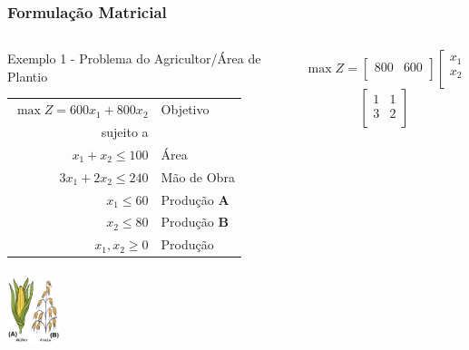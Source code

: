 \documentclass{beamer}
\begin{document}
\begin{frame}
	\frametitle{Formulação Matricial} 
	\begin{columns}
		\begin{column}{0.5\textwidth}
			\centering
			\begin{exampleblock}{Exemplo 1 - Problema do Agricultor/Área de Plantio}
				\scriptsize
				\begin{table}
					\begin{tabular}{r | l}
						{\color{red} $ \max Z = 600x_1+800x_2$ } & {\color{red} Objetivo } \\
						sujeito a & \\
						{\color{blue}$x_1+x_2 \le 100$} &  {\color{blue} Área} \\
						{\color{olive}$3x_1+2x_2 \le 240$} & {\color{olive}Mão de Obra} \\
						{$x_1 \le 60 $ } & {Produção \textbf{A} } \\
						{$x_2 \le 80 $ } &  {Produção  \textbf{B} } \\
						{$x_1, x_2 \ge 0$ } &  {Produção } \\
					\end{tabular}
				\end{table}
			\end{exampleblock}
			\includegraphics[width=1.5cm,height=2.3cm]{milho_aveia2.png}
		\end{column}
		\begin{column}{0.5\textwidth}
			\only<1>
			{
				\begin{equation*}
					 \max Z = \begin{bmatrix}
									800 & 600 \\ 
							 \end{bmatrix} 
					     	 \begin{bmatrix}
									 x_1 \\
									 x_2 \\
				    		 \end{bmatrix}
				\end{equation*}
				\begin{equation*}
					\begin{bmatrix}
							1 & 1 \\
							3 & 2 \\

\end{bmatrix}
\end{equation*}}
\end{column}
\end{columns}
\end{frame}
\end{document}
